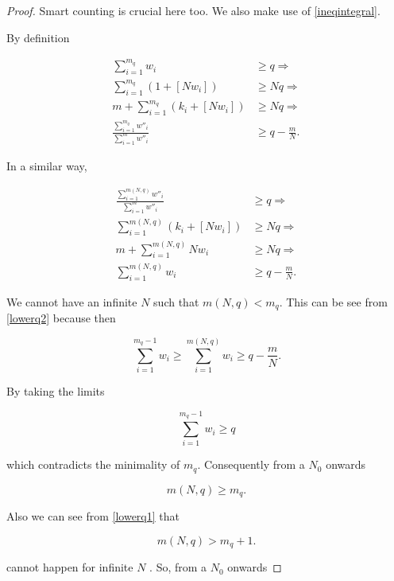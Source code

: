 \documentclass[a4paper,11pt]{article} %
\theoremstyle{definition}
\theoremstyle{remark}
\begin{document}
\begin{proof}
Smart counting is crucial here too. We also make use of \ref{ineqintegral}.

By definition

\begin{align}
\label{lowerq1}
\sum_{i=1}^{m_{q}} w_{i}  & \ge   q \Rightarrow \\
\sum_{i=1}^{m_{q}}  (1 + [N w_{i}]) & \ge  N q \Rightarrow \\
m +\sum_{i=1}^{m_{q}} (k_{i} + [N w_{i}])  & \ge  N q \Rightarrow \\
\frac{\sum_{i=1}^{m_{q}} w''_{i}}  {\sum_{i=1}^{m} w''_{i}} & \ge q - \frac{m}{N}.
\end{align}

In a similar way,

\begin{align}
\label{lowerq2}
\frac{\sum_{i=1}^{m(N,q)} w''_{i}}  {\sum_{i=1}^{m} w''_{i}}  & \ge   q \Rightarrow \\
\sum_{i=1}^{m(N,q)}  (k_{i} + [N w_{i}]) & \ge  N q \Rightarrow \\
m +\sum_{i=1}^{m(N,q)} N w_{i}  & \ge  N q \Rightarrow \\
\sum_{i=1}^{m(N,q)} w_{i}  & \ge q - \frac{m}{N}.
\end{align}

We cannot have an infinite $N$ such that $m(N, q) < m_{q}$. This can be see from \ref{lowerq2} because then

\begin{equation}
\sum_{i=1}^{m_{q} -1 } w_{i} \ge \sum_{i=1}^{m(N,q)} w_{i}   \ge q - \frac{m}{N}.
\end{equation}

By taking the limits

\begin{equation}
\sum_{i=1}^{m_{q} -1 } w_{i}   \ge q 
\end{equation}

which contradicts the minimality of $m_{q}$. Consequently from a $N_{0}$ onwards

\begin{equation}
m(N,q) \ge m_{q}.
\end{equation}


Also we can see from \ref{lowerq1} that 

\begin{equation}
m(N,q) > m_{q} +1.
\end{equation}

cannot happen for infinite $N$ . So, from a $N_{0}$ onwards


\end{proof}
\end{document}
